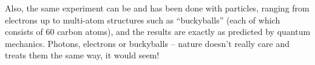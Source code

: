 Also, the same experiment can be and has been done with particles, ranging from electrons up to multi-atom structures such as ``buckyballs'' (each of which consists of 60 carbon atoms), and the results are exactly as predicted by quantum mechanics. Photons, electrons or buckyballs -- nature doesn't really care and treats them the same way, it would seem!

